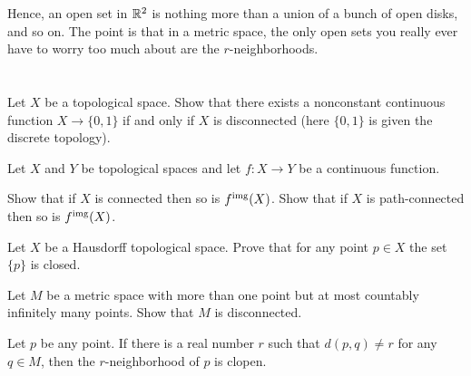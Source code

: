 Hence, an open set in $\mathbb R^2$ is nothing more than a union
of a bunch of open disks, and so on.
The point is that in a metric space, the only open sets you really
ever have to worry too much about are the $r$-neighborhoods.

\section{\problemhead}

\begin{dproblem}
	Let $X$ be a topological space.
	Show that there exists a nonconstant continuous function $X \to \{0,1\}$ if and
	only if $X$ is disconnected (here $\{0,1\}$ is given the discrete topology).
	\label{prob:disconnected_better_def}
\end{dproblem}

\begin{sproblem}
	Let $X$ and $Y$ be topological spaces
	and let $f \colon X \to Y$ be a continuous function.
	\begin{enumerate}[(a)]
		\ii Show that if $X$ is connected then so is $f^{\text{img}}(X)$.
		\ii Show that if $X$ is path-connected then so is $f^{\text{img}}(X)$.
	\end{enumerate}
\end{sproblem}

\begin{problem}
	Let $X$ be a Hausdorff topological space.
	Prove that for any point $p \in X$ the set $\{p\}$ is closed.
\end{problem}

\begin{problem}
	Let $M$ be a metric space with more than one point
	but at most countably infinitely many points.
	Show that $M$ is disconnected.
	\begin{hint}
		Let $p$ be any point.
		If there is a real number $r$ such that $d(p,q) \neq r$ for any $q \in M$,
		then the $r$-neighborhood of $p$ is clopen.
	\end{hint}
\end{problem}

